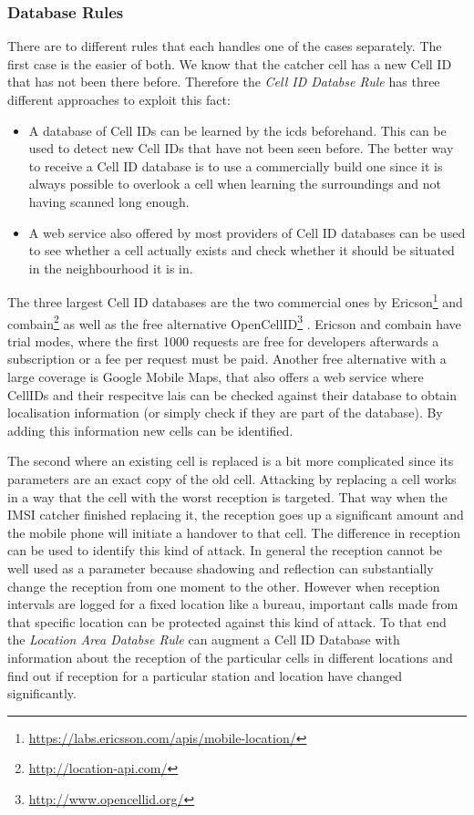 \subsubsection{Database Rules}
There are to different rules that each handles one of the cases separately.
The first case is the easier of both.
We know that the catcher cell has a new Cell ID that has not been there before.
Therefore the \emph{Cell ID Databse Rule} has three different approaches to exploit this fact:
\begin{itemize}
	\item A database of Cell IDs can be learned by the \gls{icds} beforehand. 
	This can be used to detect new Cell IDs that have not been seen before.
	The better way to receive a Cell ID database is to use a commercially build one since it is always possible to overlook a cell when learning the surroundings and not having scanned long enough.
	\item A web service also offered by most providers of Cell ID databases can be used to see whether a cell actually exists and check whether it should be situated in the neighbourhood it is in.
\end{itemize}
The three largest Cell ID databases are the two commercial ones by Ericson\footnote{\url{https://labs.ericsson.com/apis/mobile-location/}} and combain\footnote{\url{http://location-api.com/}} as well as the free alternative OpenCellID\footnote{\url{http://www.opencellid.org/}} \cite{wiki_cells}.
Ericson and combain have trial modes, where the first 1000 requests are free for developers afterwards a subscription or a fee per request must be paid.
Another free alternative with a large coverage is Google Mobile Maps, that also offers a web service where CellIDs and their respecitve \glspl{lai} can be checked against their database to obtain localisation information (or simply check if they are part of the database).
By adding this information new cells can be identified.

The second where an existing cell is replaced is a bit more complicated since its parameters are an exact copy of the old cell.
Attacking by replacing a cell works in a way that the cell with the worst reception is targeted.
That way when the IMSI catcher finished replacing it, the reception goes up a significant amount and the mobile phone will initiate a handover to that cell.
The difference in reception can be used to identify this kind of attack.
In general the reception cannot be well used as a parameter because shadowing and reflection can substantially change the reception from one moment to the other.
However when reception intervals are logged for a fixed location like a bureau, important calls made from that specific location can be protected against this kind of attack.
To that end the \emph{Location Area Databse Rule} can augment a Cell ID Database with information about the reception of the particular cells in different locations and find out if reception for a particular station and location have changed significantly.

